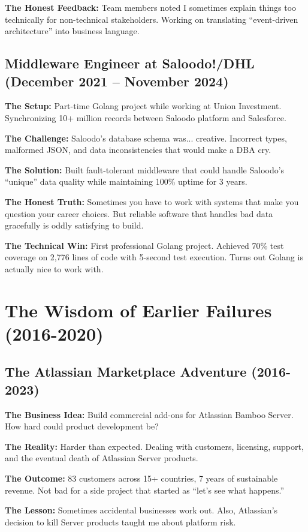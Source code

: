 \documentclass[11pt,a4paper]{article}
\begin{document}
\textbf{The Honest Feedback:} Team members noted I sometimes explain things too technically for non-technical stakeholders. Working on translating ``event-driven architecture'' into business language.

\subsection{Middleware Engineer at Saloodo!/DHL (December 2021 -- November 2024)}
\textbf{The Setup:} Part-time Golang project while working at Union Investment. Synchronizing 10+ million records between Saloodo platform and Salesforce.

\textbf{The Challenge:} Saloodo's database schema was... creative. Incorrect types, malformed JSON, and data inconsistencies that would make a DBA cry.

\textbf{The Solution:} Built fault-tolerant middleware that could handle Saloodo's ``unique'' data quality while maintaining 100\% uptime for 3 years.

\textbf{The Honest Truth:} Sometimes you have to work with systems that make you question your career choices. But reliable software that handles bad data gracefully is oddly satisfying to build.

\textbf{The Technical Win:} First professional Golang project. Achieved 70\% test coverage on 2,776 lines of code with 5-second test execution. Turns out Golang is actually nice to work with.

\section{The Wisdom of Earlier Failures (2016-2020)}

\subsection{The Atlassian Marketplace Adventure (2016-2023)}
\textbf{The Business Idea:} Build commercial add-ons for Atlassian Bamboo Server. How hard could product development be?

\textbf{The Reality:} Harder than expected. Dealing with customers, licensing, support, and the eventual death of Atlassian Server products.

\textbf{The Outcome:} 83 customers across 15+ countries, 7 years of sustainable revenue. Not bad for a side project that started as ``let's see what happens.''

\textbf{The Lesson:} Sometimes accidental businesses work out. Also, Atlassian's decision to kill Server products taught me about platform risk.
\end{document}

